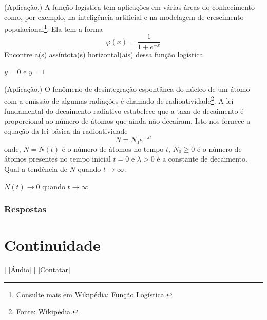 \begin{exer}(Aplicação.)
  A função logística tem aplicações em várias áreas do conhecimento como, por exemplo, na \href{https://pt.wikipedia.org/wiki/Intelig\%C3\%AAncia\_artificial}{inteligência artificial} e na modelagem de crescimento populacional\footnote{Consulte mais em \href{https://pt.wikipedia.org/wiki/Fun\%C3\%A7\%C3\%A3o\_log\%C3\%ADstica}{Wikipédia: Função Logística}.}. Ela tem a forma
  \begin{equation}
    \varphi(x) = \frac{1}{1 + e^{-x}}
  \end{equation}
  Encontre a(s) assíntota(s) horizontal(ais) dessa função logística.
\end{exer}
\begin{resp}
  $y=0$ e $y=1$
\end{resp}

\begin{exer}(Aplicação.)
  O fenômeno de desintegração espontânea do núcleo de um átomo com a emissão de algumas radiações é chamado de radioatividade\footnote{Fonte: \href{https://pt.wikipedia.org/wiki/Radioatividade}{Wikipédia}.}. A lei fundamental do decaimento radiativo estabelece que a taxa de decaimento é proporcional ao número de átomos que ainda não decaíram. Isto nos fornece a equação da lei básica da radioatividade
  \begin{equation}
    N = N_0e^{-\lambda t}
  \end{equation}
  onde, $N = N(t)$ é o número de átomos no tempo $t$, $N_0\geq 0$ é o número de átomos presentes no tempo inicial $t=0$ e $\lambda>0$ é a constante de decaimento. Qual a tendência de $N$ quando $t\to \infty$.
\end{exer}
\begin{resp}
  $N(t)\to 0$ quando $t\to \infty$
\end{resp}

\ifisbook
\subsubsection{Respostas}
\shipoutAnswer
\fi


\section{Continuidade}\label{cap_lim_sec_cont}

\begin{flushright}
  [Vídeo] | [Áudio] | \href{https://phkonzen.github.io/notas/contato.html}{[Contatar]}
\end{flushright}

